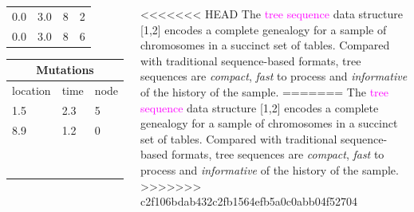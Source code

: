 \documentclass[25pt, a0paper, portrait, margin=0mm, innermargin=15mm,
     blockverticalspace=15mm, colspace=15mm, subcolspace=8mm]{tikzposter} %
\newcommand{\magenta}[1]{\textcolor{magenta}{#1}}
\begin{document}
\begin{columns}
{\begin{center}
{\begin{tabularx}{.10\textwidth}{p{1.5cm}p{1.5cm}p{2cm}X}
0.0 & 3.0 & 8 & 2\\
0.0 & 3.0 & 8 & 6 \\
\end{tabularx}\quad\quad\begin{tabularx}{.08\textwidth}{p{2.5cm}p{1.5cm}X}
\toprule
\multicolumn{3}{c}{{\bf Mutations}}\\
\midrule
location & time& node  \\
\midrule
1.5 & 2.3 & 5\\
8.9 & 1.2 & 0\\
 & &\\
 & &\\
 & &\\
 & &\\
 & &\\
 & &\\
 & &\\
 & & \\
 & & \\
 \end{tabularx}
}
\end{center}
\vspace{10mm}
<<<<<<< HEAD
{\fontsize{35}{35}\selectfont
The \magenta{tree sequence} data structure [1,2] encodes a complete genealogy for a sample of chromosomes in a succinct set of tables. Compared with traditional sequence-based formats, tree sequences are \emph{compact}, \emph{fast} to process and \emph{informative} of the history of the sample.}
=======
The \magenta{tree sequence} data structure [1,2] encodes a complete genealogy for a sample of chromosomes in a succinct set of tables. Compared with traditional sequence-based formats, tree sequences are \emph{compact}, \emph{fast} to process and \emph{informative} of the history of the sample.
>>>>>>> c2f106bdab432c2fb1564efb5a0c0abb04f52704
%
%
%
     }
     

\end{columns}
\end{document}
